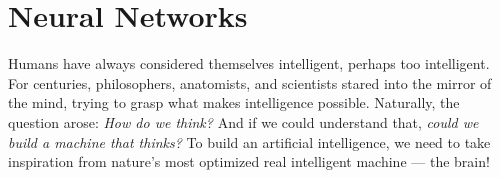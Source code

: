 \chapter{Neural Networks}

Humans have always considered themselves intelligent, perhaps too intelligent. For centuries, philosophers, anatomists, and scientists stared into the mirror of the mind, trying to grasp what makes intelligence possible. Naturally, the question arose: \textit{How do we think?} And if we could understand that, \textit{could we build a machine that thinks?} To build an artificial intelligence, we need to take inspiration from nature's most optimized real intelligent machine — the brain!








